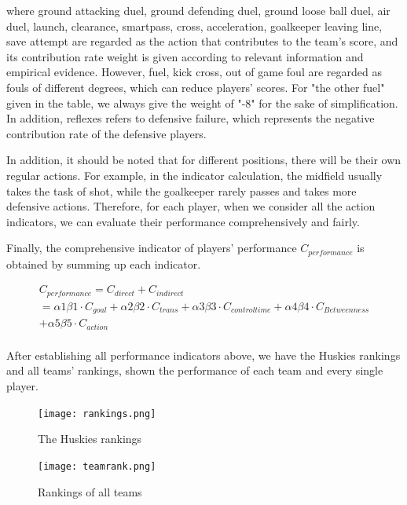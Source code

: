 \documentclass{mcmthesis}
\begin{document}
{where ground attacking duel, ground defending duel, ground loose ball duel, air duel, launch, clearance, smartpass, cross, acceleration, goalkeeper leaving line, save attempt are regarded as the action that contributes to the team's score, and its contribution rate weight is given according to relevant information and empirical evidence. However, fuel, kick cross, out of game foul are regarded as fouls of different degrees, which can reduce players' scores. For "the other fuel" given in the table, we always give the weight of "-8" for the sake of simplification. In addition, reflexes refers to defensive failure, which represents the negative contribution rate of the defensive players.


In addition, it should be noted that for different positions, there will be their own regular actions. For example, in the indicator calculation, the midfield usually takes the task of shot, while the goalkeeper rarely passes and takes more defensive actions. Therefore, for each player, when we consider all the action indicators, we can evaluate their performance comprehensively and fairly.


Finally, the comprehensive indicator of players' performance $C_{performance}$ is obtained by summing up each indicator.

\begin{equation}
\begin{array}{lr}C_{performance}=C_{direct}+ C_{indirect}\\
= \alpha1\beta1\cdot C_{goal }+ \alpha2\beta2\cdot C_{ trans }+\alpha3\beta3\cdot C_{ controltime }+\alpha4\beta4\cdot C_{ Betweenness }\\
+ \alpha5\beta5\cdot C_{action}\\
\end{array}
\end{equation}

After establishing all performance indicators above, we have the Huskies rankings and all teams' rankings, shown the performance of each team and every single player. 

\begin{figure}[h]
	\begin{minipage}[t]{0.5\textwidth}
		\centering
		\texttt{[image: rankings.png]}
		\caption{The Huskies rankings \label{fig:aa}}
	\end{minipage}
	\qquad
	\begin{minipage}[t]{0.5\textwidth}
		\centering
		\texttt{[image: teamrank.png]}
		\caption{Rankings of all teams \label{fig:aa}}
	\end{minipage}
\end{figure}



}
\end{document}
